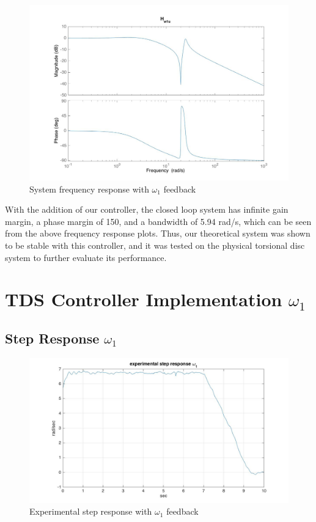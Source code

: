 \documentclass[11pt,titlepage]{article}
\begin{document}
	\begin{figure}[H]
        		\centering
        		\includegraphics[trim={1cm 0 1cm 1cm},clip,origin=c,scale=0.35]{w1_bode}
        		\caption{System frequency response with $\omega_1$ feedback}
        		\label{fig:w1_bode}
    	\end{figure}
	
	With the addition of our controller, the closed loop system has infinite gain margin, a phase margin of 150\degree, and a bandwidth of 5.94 rad/s, which can be seen from the above frequency response plots. Thus, our theoretical system was shown to be stable with this controller, and it was tested on the physical torsional disc system to further evaluate its performance. 

\section{TDS Controller Implementation $\omega_1$}
	
	\subsection{Step Response $\omega_1$}
	
	\begin{figure}[H]
        		\centering
        		\includegraphics[trim={0cm 0 0cm 0cm},clip,origin=c,scale=0.35]{w1_exp_step}
        		\caption{Experimental step response with $\omega_1$ feedback}
        		\label{fig:w1_exp_step}
    	\end{figure}
\end{document}
